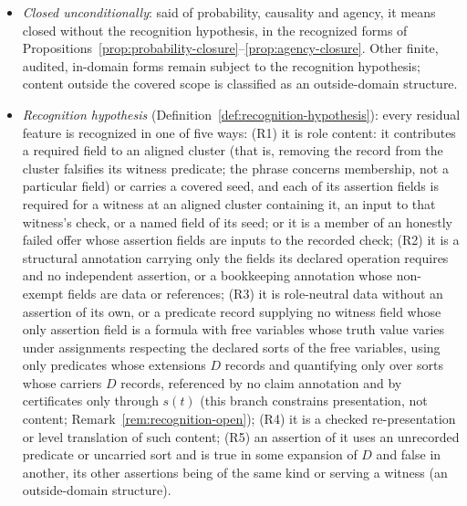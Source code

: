 \begin{itemize}[topsep=2pt,itemsep=1pt]
    admissible projection is a derived role projection
    (Definition~\ref{def:role-projection}), whose cluster satisfies its
    witness schema \(W_i\), with the attachment data of
    Definition~\ref{def:threshold-attachment}; and an admissible role witness carries the common witness data of
    Definition~\ref{def:common-witness-data}. In
    Section~\ref{sec:integrated-stress}, a misreading is called excluded when it
    is not licensed by the results of
    Sections~\ref{sec:fatcd-domain}--\ref{sec:decomposition-exhaustion}.
  \item \emph{Closed unconditionally}: said of probability, causality and
    agency, it means closed without the recognition hypothesis, in the
    recognized forms of
    Propositions~\ref{prop:probability-closure}--\ref{prop:agency-closure}.
    Other finite, audited, in-domain forms remain subject to the
    recognition hypothesis; content outside the covered scope is
    classified as an outside-domain structure.
  \item \emph{Recognition hypothesis}
    (Definition~\ref{def:recognition-hypothesis}): every residual feature is
    recognized in one of five ways: (R1) it is role content: it contributes
    a required field to an aligned cluster (that is, removing the record from
    the cluster falsifies its witness predicate; the phrase concerns
    membership, not a particular field) or carries a covered seed, and
    each of its assertion fields is required for a witness at an aligned
    cluster containing it, an input to that witness's check, or a named
    field of its seed; or it is a member of an honestly failed offer whose
    assertion fields are inputs to the recorded check; (R2) it is a
    structural annotation carrying only the fields its declared operation
    requires and no independent assertion, or a bookkeeping annotation whose
    non-exempt fields are data or references; (R3) it is role-neutral data
    without an assertion of its own, or a predicate record supplying no witness field whose only assertion field is a formula with free variables whose truth value varies under assignments respecting the declared sorts of the free variables, using only predicates whose extensions \(D\) records and quantifying only over sorts whose carriers \(D\) records, referenced by no claim annotation and by certificates only through \(s(t)\) (this branch constrains presentation, not content; Remark~\ref{rem:recognition-open}); (R4) it is a checked re-presentation or
    level translation of such content; (R5) an assertion of it uses an unrecorded predicate or uncarried sort and is true in some expansion of \(D\) and false in another, its other assertions being of the same kind or serving a witness (an outside-domain structure).

\end{itemize}
